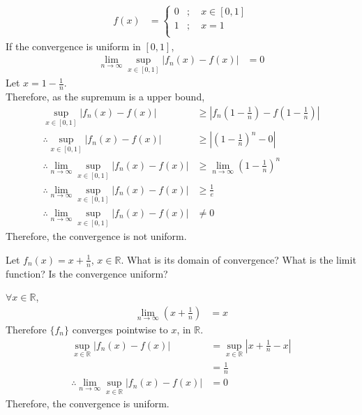 \documentclass[fleqn, a4paper, 12pt, twoside]{article}
\theoremstyle{definition}
\theoremstyle{theorem}
\begin{document}
\begin{solution}
	\begin{align*}
		f(x) &=
			\begin{cases}
				0 & ;\quad x \in [0,1] \\
				1 & ;\quad x = 1       \\
			\end{cases}
	\end{align*}
	If the convergence is uniform in $[0,1]$,
	\begin{align*}
		\lim\limits_{n \to \infty} \sup\limits_{x \in [0,1]} |f_n(x) - f(x)| &= 0
	\end{align*}
	Let $x = 1 - \frac{1}{n}$.\\
	Therefore, as the supremum is a upper bound,
	\begin{align*}
		\sup\limits_{x \in [0,1]} |f_n(x) - f(x)|                                       & \ge \left| f_n\left( 1 - \frac{1}{n} \right)  - f\left( 1 - \frac{1}{n} \right) \right| \\
		\therefore \sup\limits_{x \in [0,1]} |f_n(x) - f(x)|                            & \ge \left| \left( 1 - \frac{1}{n} \right)^n - 0 \right|                                 \\
		\therefore \lim\limits_{n \to \infty} \sup\limits_{x \in [0,1]} |f_n(x) - f(x)| & \ge \lim\limits_{n \to \infty} \left( 1 - \frac{1}{n} \right)^n                         \\
		\therefore \lim\limits_{n \to \infty} \sup\limits_{x \in [0,1]} |f_n(x) - f(x)| & \ge \frac{1}{e}                                                                         \\
		\therefore \lim\limits_{n \to \infty} \sup\limits_{x \in [0,1]} |f_n(x) - f(x)| & \neq 0
	\end{align*}
	Therefore, the convergence is not uniform.
\end{solution}

\begin{question}
	Let $f_n(x) = x + \frac{1}{n}$, $x \in \mathbb{R}$.
	What is its domain of convergence?
	What is the limit function?
	Is the convergence uniform?
\end{question}

\begin{solution}
	$\forall x \in \mathbb{R}$,
	\begin{align*}
		\lim\limits_{n \to \infty} \left( x + \frac{1}{n} \right) & = x
	\end{align*}
	Therefore $\{f_n\}$ converges pointwise to $x$, in $\mathbb{R}$.
	\begin{align*}
		\sup\limits_{x \in \mathbb{R}} |f_n(x) - f(x)|                                       & = \sup\limits_{x \in \mathbb{R}} \left| x + \frac{1}{n} - x \right| \\
                                                                                                     & = \frac{1}{n}                                                       \\
		\therefore \lim\limits_{n \to \infty} \sup\limits_{x \in \mathbb{R}} |f_n(x) - f(x)| & = 0
	\end{align*}
	Therefore, the convergence is uniform.
\end{solution}
\end{document}
